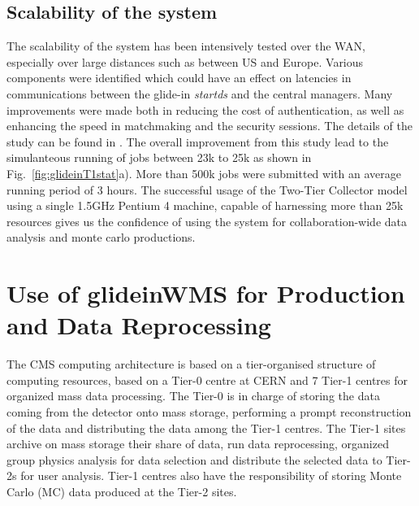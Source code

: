 \documentclass[a4paper]{jpconf}
\begin{document}
\subsection {Scalability of the system}
The scalability of the system has been intensively tested over the WAN, especially over large distances such 
as between US and Europe. Various components were identified which could have an effect on
latencies in communications between the glide-in \emph{startds} and the central managers. Many improvements were
made both in reducing the cost of authentication, as well as enhancing the speed in matchmaking and 
the security sessions. The details of the study can be found in \cite{bib:scalability}. The overall improvement 
from this study lead to the simulanteous running of jobs between 23k to 25k as shown in Fig.~\ref{fig:glideinT1stat}a).
More than 500k jobs were submitted with an average running period of 3 hours. The successful usage
of the Two-Tier Collector model using a single 1.5GHz Pentium 4 machine, capable of harnessing more than 25k 
resources gives us the confidence of using the system for collaboration-wide data analysis and monte carlo 
productions.
\section{Use of glideinWMS for Production and Data Reprocessing }
The CMS computing architecture \cite{bib:cms_computing_arch} is based on a tier-organised structure of computing
resources, based on a Tier-0 centre at CERN and 7 Tier-1 centres for organized mass data processing. 
The Tier-0 is in charge of storing the data coming from the detector onto mass storage, performing a prompt 
reconstruction of the data and distributing the data among the Tier-1 centres. The Tier-1 sites archive on
mass storage their share of data, run data reprocessing, organized group physics analysis for data
selection and distribute the selected data to Tier-2s for user analysis. Tier-1 centres also
have the responsibility of storing Monte Carlo (MC) data produced at the Tier-2 sites. 
\end{document}
